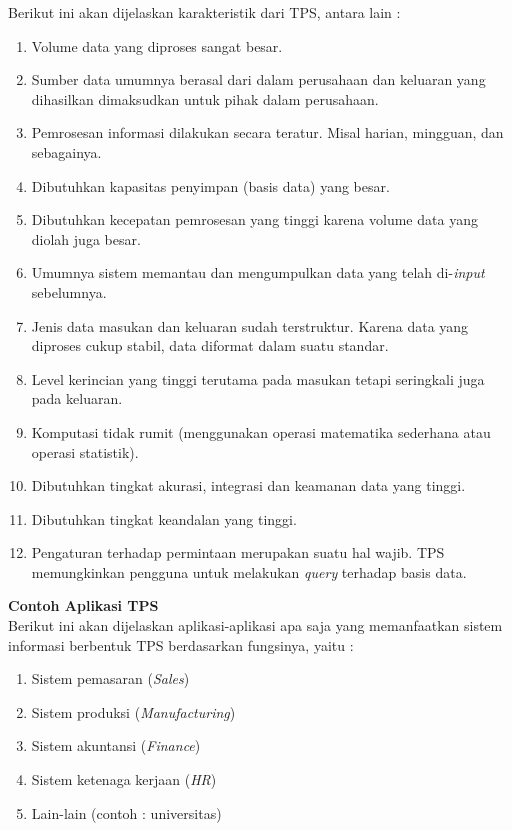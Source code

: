 Berikut ini akan dijelaskan karakteristik dari TPS, antara lain \cite{Turban:2001} : 
\begin{enumerate}
	\item Volume data yang diproses sangat besar.
	\item Sumber data umumnya berasal dari dalam perusahaan dan keluaran yang dihasilkan dimaksudkan untuk pihak dalam perusahaan.
	\item Pemrosesan informasi dilakukan secara teratur. Misal harian, mingguan, dan sebagainya.
	\item Dibutuhkan kapasitas penyimpan (basis data) yang besar.
	\item Dibutuhkan kecepatan pemrosesan yang tinggi karena volume data yang diolah juga besar.
	\item Umumnya sistem memantau dan mengumpulkan data yang telah di-\textit{input} sebelumnya.
	\item Jenis data masukan dan keluaran sudah terstruktur. Karena data yang diproses cukup stabil, data diformat dalam suatu standar.
	\item Level kerincian yang tinggi terutama pada masukan tetapi seringkali juga pada keluaran.
	\item Komputasi tidak rumit (menggunakan operasi matematika sederhana atau operasi statistik).
	\item Dibutuhkan tingkat akurasi, integrasi dan keamanan data yang tinggi.
	\item Dibutuhkan tingkat keandalan yang tinggi.
	\item Pengaturan terhadap permintaan merupakan suatu hal wajib. TPS memungkinkan pengguna untuk melakukan \textit{query} terhadap basis data.
\end{enumerate}

\textbf{Contoh Aplikasi TPS}\\
Berikut ini akan dijelaskan aplikasi-aplikasi apa saja yang memanfaatkan sistem informasi berbentuk TPS berdasarkan fungsinya, yaitu \cite{Laudon:2011} :
\begin{enumerate}
	\item Sistem pemasaran (\textit{Sales})
	\item Sistem produksi (\textit{Manufacturing})
	\item Sistem akuntansi (\textit{Finance})
	\item Sistem ketenaga kerjaan (\textit{HR})
	\item Lain-lain (contoh : universitas)
\end{enumerate}

